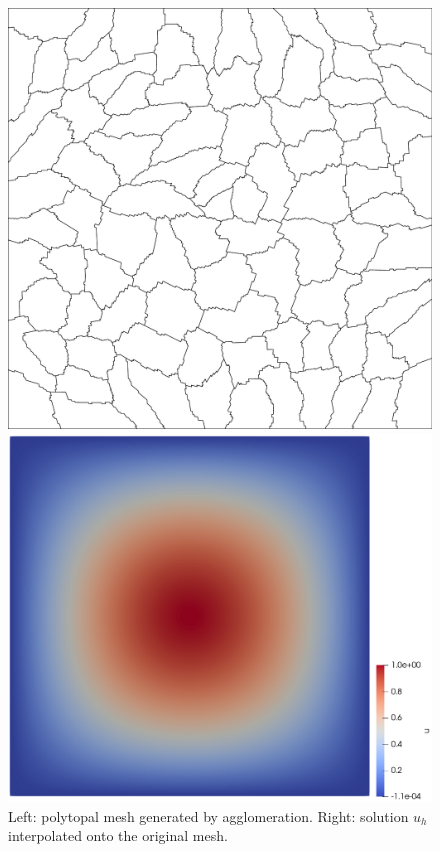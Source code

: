 \documentclass[a4paper,12pt]{article}
\begin{document}
\begin{figure}[htbp]
    \centering
    \begin{minipage}{0.41\textwidth}
        \centering
        \includegraphics[width=\linewidth]{polygonmetis_91.pdf}
    \end{minipage}
    \hfill
    \begin{minipage}{0.48\textwidth}
        \centering
        \includegraphics[width=\linewidth]{interpolated_solution.pdf}
    \end{minipage}
    \caption{Left: polytopal mesh generated by agglomeration. Right: solution $u_h$ interpolated onto the original mesh.}
    \label{fig:poly_mesh_and_solution}
\end{figure}
\end{document}
